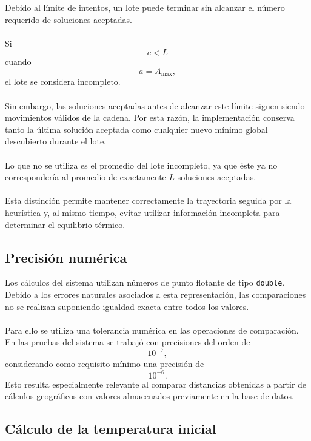 \documentclass[12pt]{article}
\begin{document}
Debido al límite de intentos, un lote puede terminar sin alcanzar el número
requerido de soluciones aceptadas.
\\\\
Si
\[
    c<L
\]
cuando
\[
    a=A_{\max},
\]
el lote se considera incompleto.
\\\\
Sin embargo, las soluciones aceptadas antes de alcanzar este límite siguen
siendo movimientos válidos de la cadena. Por esta razón, la implementación
conserva tanto la última solución aceptada como cualquier nuevo mínimo
global descubierto durante el lote.
\\\\
Lo que no se utiliza es el promedio del lote incompleto, ya que éste ya no
correspondería al promedio de exactamente \(L\) soluciones aceptadas.
\\\\
Esta distinción permite mantener correctamente la trayectoria seguida por la
heurística y, al mismo tiempo, evitar utilizar información incompleta para
determinar el equilibrio térmico.

\subsection{Precisión numérica}

Los cálculos del sistema utilizan números de punto flotante de tipo
\texttt{double}. Debido a los errores naturales asociados a esta
representación, las comparaciones no se realizan suponiendo igualdad exacta
entre todos los valores.
\\\\
Para ello se utiliza una tolerancia numérica en las operaciones de
comparación. En las pruebas del sistema se trabajó con precisiones del orden
de
\[
    10^{-7},
\]
considerando como requisito mínimo una precisión de
\[
    10^{-6}.
\]
Esto resulta especialmente relevante al comparar distancias obtenidas a
partir de cálculos geográficos con valores almacenados previamente en la
base de datos.

\subsection{Cálculo de la temperatura inicial}
\end{document}
